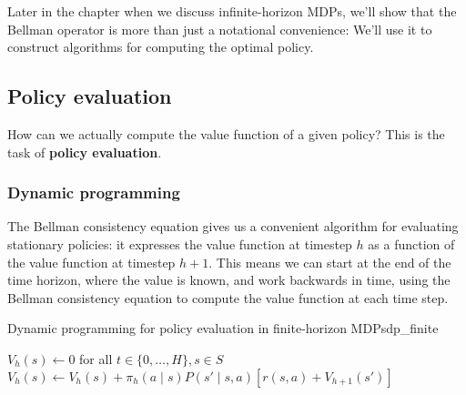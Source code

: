 \documentclass[../main/main]{subfiles}
\begin{document}
Later in the chapter when we discuss infinite-horizon MDPs, we'll show that the Bellman operator is more than just a notational convenience: We'll use it to construct algorithms for computing the optimal policy.

\subsection{Policy evaluation}

How can we actually compute the value function of a given policy? This is the task of \textbf{policy evaluation}.

\subsubsection{Dynamic programming}
\label{sec:dp}

The Bellman consistency equation gives us a convenient algorithm for evaluating stationary policies: it expresses the value function at timestep $h$ as a function of the value function at timestep $h+1$. This means we can start at the end of the time horizon, where the value is known, and work backwards in time, using the Bellman consistency equation to compute the value function at each time step.

\begin{definition}{Dynamic programming for policy evaluation in finite-horizon MDPs}{dp_finite}
    \begin{algorithmic}
\State $V_h(s) \gets 0$ for all $t \in \{ 0, \dots, H \}, s \in S$
        \State $V_h(s) \gets V_h(s) + \pi_h(a \mid s) P(s' \mid s, a) [r(s, a) + V_{h+1}(s')]$
    \EndFor
\EndFor
    \end{algorithmic}
\end{definition}
\end{document}
